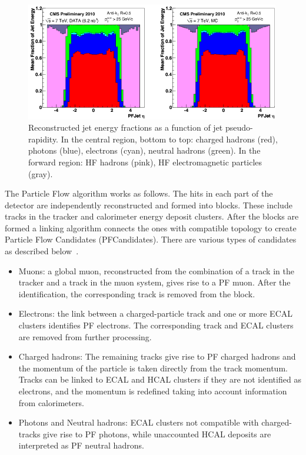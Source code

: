\begin{figure}
\begin{center}
\includegraphics[width=0.99\textwidth]{Reconstruction/Pandolfi_jetenergy.pdf}
\caption{Reconstructed jet energy fractions as a function of jet pseudo-rapidity. In the central region, bottom to top: charged hadrons (red), photons (blue), electrons (cyan), neutral hadrons (green). In the forward region: HF hadrons (pink), HF electromagnetic particles (gray).~\cite{Pandolfi_thesis}}
\label{fig:jet_energy_components}
\end{center}
\end{figure}

The Particle Flow algorithm works as follows. The hits in each part of the detector are independently reconstructed and formed into blocks.  These include tracks in the tracker and calorimeter energy deposit clusters. After the blocks are formed a linking algorithm connects the ones with compatible topology to create Particle Flow Candidates (PFCandidates).  There are various types of candidates as described below~\cite{Cosa_thesis}.

\begin{itemize}
\item
Muons: a global muon, reconstructed from the combination of a track in the tracker and a track in the muon system, gives rise to a PF muon. After the identification, the corresponding track is removed from the block.
\item
 Electrons: the link between a charged-particle track and one or more ECAL clusters identifies PF electrons. The corresponding track and ECAL clusters are removed from further processing.
\item
 Charged hadrons: The remaining tracks give rise to PF charged hadrons and the momentum of the particle is taken directly from the track momentum. Tracks can be linked to ECAL and HCAL clusters if they are not identified as electrons, and the momentum is redefined taking into account information from calorimeters.
\item
Photons and Neutral hadrons: ECAL clusters not compatible with charged-tracks give rise to PF photons, while unaccounted HCAL deposits are interpreted as PF neutral hadrons.
\end{itemize}

